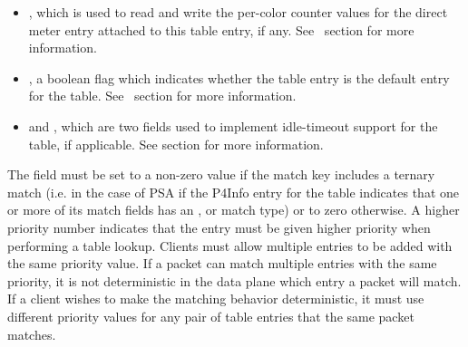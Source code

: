 \documentclass[11pt]{article}
\begin{document}
{\begin{itemize}
\item{}
, which is used to read and write the per-color counter
values for the direct meter entry attached to this table entry, if any.
See~ section for more information.%

\item{}
, a boolean flag which indicates whether the table entry is
the default entry for the table. See~
section for more information.%

\item{}
 and , which are two fields used to
implement idle-timeout support for the table, if applicable. See
 section for more information.%
\end{itemize}%

\noindent{}The  field must be set to a non-zero value if the match key includes a
ternary match (i.e. in the case of PSA if the P4Info entry for the table
indicates that one or more of its match fields has an ,  or
 match
type) or to zero otherwise. A higher priority number indicates that the entry
must be given higher priority when performing a table lookup. Clients must allow
multiple entries to be added with the same priority value.  If a packet can
match multiple entries with the same priority, it is not deterministic in the
data plane which entry a packet will match.  If a client wishes to make the
matching behavior deterministic, it must use different priority values for any
pair of table entries that the same packet matches.%

}
\end{document}
